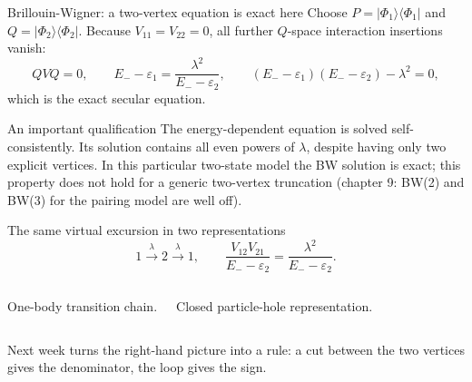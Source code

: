\documentclass[aspectratio=169,10pt]{beamer}
\newcommand{\ket}[1]{\vert #1\rangle}
\newcommand{\bra}[1]{\langle #1\vert}
\begin{document}
\begin{frame}{Brillouin-Wigner: a two-vertex equation is exact here}
Choose \(P=\ket{\Phi_1}\bra{\Phi_1}\) and \(Q=\ket{\Phi_2}\bra{\Phi_2}\).
Because \(V_{11}=V_{22}=0\), all further \(Q\)-space interaction insertions vanish:
\[
QVQ=0,\qquad
\boxed{E_--\varepsilon_1=\frac{\lambda^2}{E_--\varepsilon_2},}
\qquad
\boxed{(E_--\varepsilon_1)(E_--\varepsilon_2)-\lambda^2=0,}
\]
which is the exact secular equation.
\begin{block}{An important qualification}
The energy-dependent equation is solved self-consistently. Its solution contains all even powers of \(\lambda\), despite having only two explicit vertices. In this particular two-state model the BW solution is exact; this property does not hold for a generic two-vertex truncation (chapter 9: BW(2) and BW(3) for the pairing model are well off).
\end{block}
\end{frame}

\begin{frame}{The same virtual excursion in two representations}
\[
1\xrightarrow{\lambda}2\xrightarrow{\lambda}1,
\qquad \frac{V_{12}V_{21}}{E_--\varepsilon_2}
=\frac{\lambda^2}{E_--\varepsilon_2}.
\]
\begin{columns}[c,onlytextwidth]
\centering
{}
\par\small One-body transition chain.
\centering
{}
\par\small Closed particle-hole representation.
\end{columns}
\medskip
\small Next week turns the right-hand picture into a rule: a cut between the two vertices gives the denominator, the loop gives the sign.
\end{frame}
\end{document}

